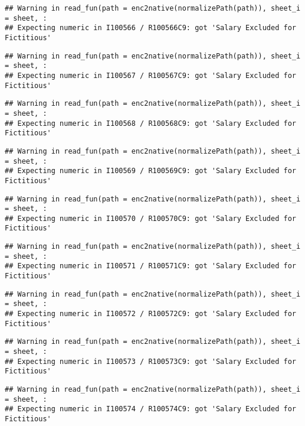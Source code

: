\documentclass[
]{article}
\begin{document}
\begin{verbatim}
## Warning in read_fun(path = enc2native(normalizePath(path)), sheet_i = sheet, :
## Expecting numeric in I100566 / R100566C9: got 'Salary Excluded for Fictitious'
\end{verbatim}

\begin{verbatim}
## Warning in read_fun(path = enc2native(normalizePath(path)), sheet_i = sheet, :
## Expecting numeric in I100567 / R100567C9: got 'Salary Excluded for Fictitious'
\end{verbatim}

\begin{verbatim}
## Warning in read_fun(path = enc2native(normalizePath(path)), sheet_i = sheet, :
## Expecting numeric in I100568 / R100568C9: got 'Salary Excluded for Fictitious'
\end{verbatim}

\begin{verbatim}
## Warning in read_fun(path = enc2native(normalizePath(path)), sheet_i = sheet, :
## Expecting numeric in I100569 / R100569C9: got 'Salary Excluded for Fictitious'
\end{verbatim}

\begin{verbatim}
## Warning in read_fun(path = enc2native(normalizePath(path)), sheet_i = sheet, :
## Expecting numeric in I100570 / R100570C9: got 'Salary Excluded for Fictitious'
\end{verbatim}

\begin{verbatim}
## Warning in read_fun(path = enc2native(normalizePath(path)), sheet_i = sheet, :
## Expecting numeric in I100571 / R100571C9: got 'Salary Excluded for Fictitious'
\end{verbatim}

\begin{verbatim}
## Warning in read_fun(path = enc2native(normalizePath(path)), sheet_i = sheet, :
## Expecting numeric in I100572 / R100572C9: got 'Salary Excluded for Fictitious'
\end{verbatim}

\begin{verbatim}
## Warning in read_fun(path = enc2native(normalizePath(path)), sheet_i = sheet, :
## Expecting numeric in I100573 / R100573C9: got 'Salary Excluded for Fictitious'
\end{verbatim}

\begin{verbatim}
## Warning in read_fun(path = enc2native(normalizePath(path)), sheet_i = sheet, :
## Expecting numeric in I100574 / R100574C9: got 'Salary Excluded for Fictitious'
\end{verbatim}
\end{document}
